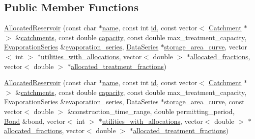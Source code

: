 \subsection*{Public Member Functions}
\begin{DoxyCompactItemize}
\item 
\mbox{\hyperlink{classAllocatedReservoir_a0b2d620a1d1fe9a9fe053269f35a9a70}{Allocated\+Reservoir}} (const char $\ast$\mbox{\hyperlink{classWaterSource_a846ea74c5b453d014f594d41fee8c765}{name}}, const int \mbox{\hyperlink{classWaterSource_a6eafe5dfefd317877d1244e8a7c6e742}{id}}, const vector$<$ \mbox{\hyperlink{classCatchment}{Catchment}} $\ast$$>$ \&\mbox{\hyperlink{classWaterSource_a8c18c34f23f8a06685c1d12f462ed830}{catchments}}, const double \mbox{\hyperlink{classWaterSource_a2ec257b415b248214a8bce7fc5267723}{capacity}}, const double max\+\_\+treatment\+\_\+capacity, \mbox{\hyperlink{classEvaporationSeries}{Evaporation\+Series}} \&\mbox{\hyperlink{classReservoir_a2d2d9b302c13703309bb798d24136810}{evaporation\+\_\+series}}, \mbox{\hyperlink{classDataSeries}{Data\+Series}} $\ast$\mbox{\hyperlink{classReservoir_a46bd5b750963dfa9a57b247fd77ab8ff}{storage\+\_\+area\+\_\+curve}}, vector$<$ int $>$ $\ast$\mbox{\hyperlink{classWaterSource_ac345583fc2d0f7e1db31ee40244d7ace}{utilities\+\_\+with\+\_\+allocations}}, vector$<$ double $>$ $\ast$\mbox{\hyperlink{classWaterSource_a2f6655a80c4847fe039987255d9d998c}{allocated\+\_\+fractions}}, vector$<$ double $>$ $\ast$\mbox{\hyperlink{classWaterSource_aa73fe10cfc6579b2fb79529e1dde5140}{allocated\+\_\+treatment\+\_\+fractions}})
\item 
\mbox{\hyperlink{classAllocatedReservoir_a22794afc1f06d13fc3099015a2250b0d}{Allocated\+Reservoir}} (const char $\ast$\mbox{\hyperlink{classWaterSource_a846ea74c5b453d014f594d41fee8c765}{name}}, const int \mbox{\hyperlink{classWaterSource_a6eafe5dfefd317877d1244e8a7c6e742}{id}}, const vector$<$ \mbox{\hyperlink{classCatchment}{Catchment}} $\ast$$>$ \&\mbox{\hyperlink{classWaterSource_a8c18c34f23f8a06685c1d12f462ed830}{catchments}}, const double \mbox{\hyperlink{classWaterSource_a2ec257b415b248214a8bce7fc5267723}{capacity}}, const double max\+\_\+treatment\+\_\+capacity, \mbox{\hyperlink{classEvaporationSeries}{Evaporation\+Series}} \&\mbox{\hyperlink{classReservoir_a2d2d9b302c13703309bb798d24136810}{evaporation\+\_\+series}}, \mbox{\hyperlink{classDataSeries}{Data\+Series}} $\ast$\mbox{\hyperlink{classReservoir_a46bd5b750963dfa9a57b247fd77ab8ff}{storage\+\_\+area\+\_\+curve}}, const vector$<$ double $>$ \&construction\+\_\+time\+\_\+range, double permitting\+\_\+period, \mbox{\hyperlink{classBond}{Bond}} \&bond, vector$<$ int $>$ $\ast$\mbox{\hyperlink{classWaterSource_ac345583fc2d0f7e1db31ee40244d7ace}{utilities\+\_\+with\+\_\+allocations}}, vector$<$ double $>$ $\ast$\mbox{\hyperlink{classWaterSource_a2f6655a80c4847fe039987255d9d998c}{allocated\+\_\+fractions}}, vector$<$ double $>$ $\ast$\mbox{\hyperlink{classWaterSource_aa73fe10cfc6579b2fb79529e1dde5140}{allocated\+\_\+treatment\+\_\+fractions}})

\end{DoxyCompactItemize}

